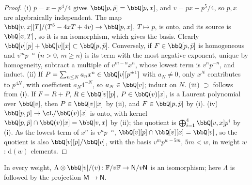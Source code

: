\begin{proof}
(i) $\bar p=x-p^4/4$ gives $\bbQ[p,\bar p]=\bbQ[p,x]$, and $v=px-p^5/4$, so $p,x$ are algebraically independent. The map $\bbQ[v,x][T]/(T^5-4xT+4v)\to\bbQ[p,x]$, $T\mapsto p$, is onto, and its source is $\bbQ[x,T]$, so it is an isomorphism, which gives the basis. Clearly $\bbQ[v][p]+\bbQ[v][x]\subset\bbQ[p,\bar p]$. Conversely, if $F\in\bbQ[p,\bar p]$ is homogeneous and $v^mp^{-n}$ ($n>0$, $m\geq n$) is its term with the most negative exponent, unique by homogeneity, subtract a multiple of $v^{m-n}x^n$, whose lowest term is $v^np^{-n}$, and induct. (ii) If $P=\sum_{n\leq N}a_nx^n\in\bbQ[v][p^{\pm1}]$ with $a_N\neq 0$, only $x^N$ contributes to $p^{4N}$, with coefficient $a_N4^{-N}$, so $a_N\in\bbQ[v]$; induct on $N$. (iii) $\supset$ follows from (i). If $F=R+P$, $R\in\bbQ[v][p]$, $P\in\bbQ(v)[x]$, is a Laurent polynomial over $\bbQ[v]$, then $P\in\bbQ[v][x]$ by (ii), and $F\in\bbQ[p,\bar p]$ by (i). (iv) $\bbQ[p,\bar p]\to\cL/\bbQ(v)[x]$ is onto, with kernel $\bbQ[p,\bar p]\cap\bbQ(v)[x]=\bbQ[v,x]$ by (ii); the quotient is $\bigoplus_{i=1}^4\bbQ[v,x]p^i$ by (i). As the lowest term of $x^n$ is $v^np^{-n}$, $\bbQ[v][p]\cap\bbQ[v][x]=\bbQ[v]$, so the quotient is also $\bbQ[v][p]/\bbQ[v]$, with the basis $v^mp^{w-5m}$, $5m<w$, in weight $w$: $\mathrm d(w)$ elements.
\end{proof}

\begin{lem}
\label{lem:mod-modv}
In every weight, $\Lambda\otimes\bbQ[v]/(v)\colon\mathbb F/v\mathbb F\to\mathsf N/v\mathsf N$ is an isomorphism; here $\Lambda$ is followed by the projection $\mathsf M\to\mathsf N$.
\end{lem}

